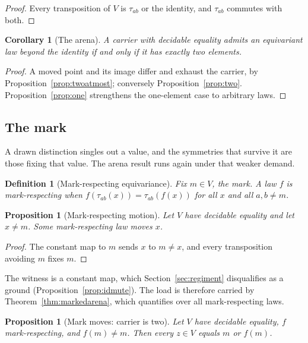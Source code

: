 \documentclass[11pt]{article}
\newtheorem{proposition}[theorem]{Proposition}
\newtheorem{definition}[theorem]{Definition}
\newtheorem{corollary}[theorem]{Corollary}
\begin{document}
\begin{proof}
Every transposition of $V$ is $\tau_{ab}$ or the identity, and $\tau_{ab}$ commutes with both.
\end{proof}

\begin{corollary}[The arena]
\label{cor:arena}
A carrier with decidable equality admits an equivariant law beyond the identity if and only if it has exactly two elements.
\end{corollary}

\begin{proof}
A moved point and its image differ and exhaust the carrier, by Proposition~\ref{prop:twoatmost}; conversely Proposition~\ref{prop:two}. Proposition~\ref{prop:one} strengthens the one-element case to arbitrary laws.
\end{proof}

\subsection{The mark}
\label{sec:mark}

A drawn distinction singles out a value, and the symmetries that survive it are those fixing that value. The arena result runs again under that weaker demand.

\begin{definition}[Mark-respecting equivariance]
\label{def:markequiv}
Fix $m \in V$, the \emph{mark}. A law $f$ is \emph{mark-respecting} when $f(\tau_{ab}(x)) = \tau_{ab}(f(x))$ for all $x$ and all $a, b \neq m$.
\end{definition}

\begin{proposition}[Mark-respecting motion]
\label{prop:markmoves}
Let $V$ have decidable equality and let $x \neq m$. Some mark-respecting law moves $x$.
\end{proposition}

\begin{proof}
The constant map to $m$ sends $x$ to $m \neq x$, and every transposition avoiding $m$ fixes $m$.
\end{proof}

The witness is a constant map, which Section~\ref{sec:regiment} disqualifies as a ground (Proposition~\ref{prop:idmute}). The load is therefore carried by Theorem~\ref{thm:markedarena}, which quantifies over all mark-respecting laws.

\begin{proposition}[Mark moves: carrier is two]
\label{prop:markpivot}
Let $V$ have decidable equality, $f$ mark-respecting, and $f(m) \neq m$. Then every $z \in V$ equals $m$ or $f(m)$.
\end{proposition}
\end{document}
